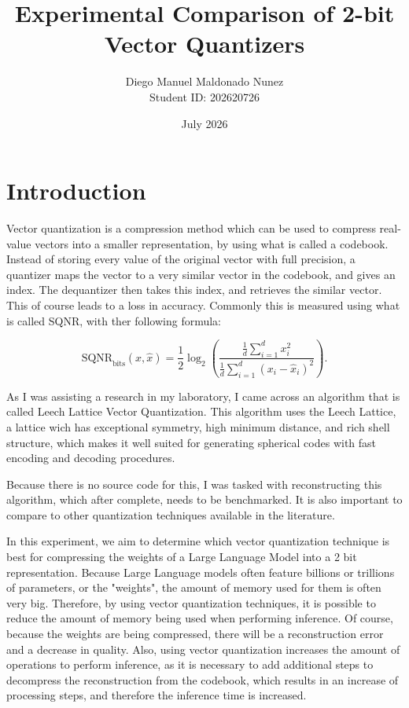\documentclass[11pt]{article}
\title{Experimental Comparison of 2-bit Vector Quantizers}
\author{Diego Manuel Maldonado Nunez\\Student ID: 202620726}
\date{July 2026}
\begin{document}
\maketitle

\section{Introduction}

Vector quantization is a compression method which can be used to compress real-value vectors into a smaller representation, by using what is called a codebook.
Instead of storing every value of the original vector with full precision, a quantizer maps the vector to a very similar vector in the codebook, and gives an index.
The dequantizer then takes this index, and retrieves the similar vector. This of course leads to a loss in accuracy. Commonly this is measured using what is called SQNR, with ther following formula:


\[
\mathrm{SQNR}_{\mathrm{bits}}(x,\hat{x}) =
\frac{1}{2}\log_2
\left(
\frac{
\frac{1}{d}\sum_{i=1}^{d}x_i^2
}{
\frac{1}{d}\sum_{i=1}^{d}(x_i-\hat{x}_i)^2
}
\right).
\]

As I was assisting a research in my laboratory, I came across an algorithm that is called Leech Lattice Vector Quantization\cite{llvq}. This algorithm
uses the Leech Lattice, a lattice wich has exceptional symmetry, high minimum distance, and rich shell structure, which makes it well suited for generating spherical codes with
fast encoding and decoding procedures.

Because there is no source code for this, I was tasked with reconstructing this algorithm, which after complete, needs to be benchmarked. It is also important to compare to other quantization
techniques available in the literature.

In this experiment, we aim to determine which vector quantization technique is best for compressing the weights of a Large Language Model into a 2 bit representation. Because Large Language
models often feature billions or trillions of parameters, or the "weights", the amount of memory used for them is often very big. Therefore, by using vector quantization techniques, it is possible
to reduce the amount of memory being used when performing inference. Of course, because the weights are being compressed, there will be a reconstruction error and a decrease in quality. Also,
using vector quantization increases the amount of operations to perform inference, as it is necessary to add additional steps to decompress the reconstruction from the codebook, which results
in an increase of processing steps, and therefore the inference time is increased.
\end{document}
